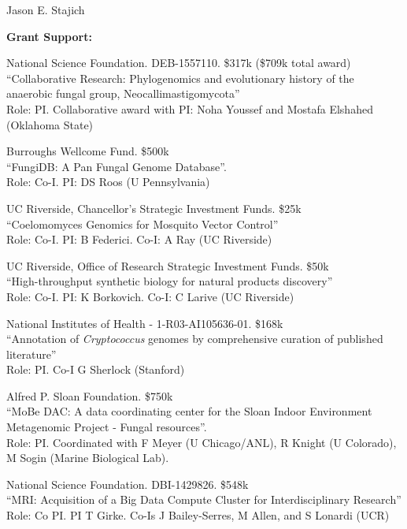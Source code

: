 \documentclass[10pt]{article}
\begin{document}
\begin{cv}{\centerline{Jason E. Stajich}}
\begin{cvlistcompact}{\bf Grant Support:}
\item [2016-2019] National Science Foundation. DEB-1557110. \$317k
  (\$709k total award) \\
``Collaborative Research: Phylogenomics and evolutionary history of the anaerobic fungal group, Neocallimastigomycota'' \\
Role: PI. Collaborative award with PI: Noha Youssef and Mostafa Elshahed (Oklahoma State)
 
\item [{\bf Completed support}]

\item [2010-2013] Burroughs Wellcome Fund. \$500k \\
 ``FungiDB: A Pan Fungal Genome Database''. \\
Role: Co-I. PI: DS Roos (U Pennsylvania)

\item [2011-2012] UC Riverside, Chancellor's Strategic Investment
  Funds. \$25k \\
``Coelomomyces Genomics for Mosquito Vector Control'' \\
Role: Co-I. PI: B Federici. Co-I: A Ray (UC Riverside)

\item [2013-2014] UC Riverside, Office of Research Strategic Investment
  Funds. \$50k \\
``High-throughput synthetic biology for natural products discovery'' \\
Role: Co-I. PI: K Borkovich. Co-I: C Larive (UC Riverside)

\item [2013-2014] National Institutes of Health - 1-R03-AI105636-01. \$168k \\
``Annotation of \textit{Cryptococcus} genomes by comprehensive
  curation of published literature'' \\
Role: PI. Co-I G Sherlock (Stanford)

  \item [2011-2014] Alfred P. Sloan Foundation. \$750k \\
``MoBe DAC: A data coordinating center for the Sloan Indoor
Environment Metagenomic Project - Fungal resources''. \\
Role: PI.  Coordinated with F Meyer (U Chicago/ANL), R Knight (U Colorado), M Sogin (Marine Biological Lab).

\item [2014-2015] National Science Foundation. DBI-1429826. \$548k \\
``MRI: Acquisition of a Big Data Compute Cluster for Interdisciplinary
  Research''
Role: Co PI. PI T Girke. Co-Is J Bailey-Serres, M Allen, and S Lonardi (UCR)


\end{cvlistcompact}
\end{cv}
\end{document}
